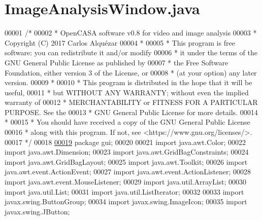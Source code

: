 \hypertarget{_image_analysis_window_8java_source}{}\section{Image\+Analysis\+Window.\+java}
\label{_image_analysis_window_8java_source}

\begin{DoxyCode}
00001 \textcolor{comment}{/*}
00002 \textcolor{comment}{ *   OpenCASA software v0.8 for video and image analysis}
00003 \textcolor{comment}{ *   Copyright (C) 2017  Carlos Alquézar}
00004 \textcolor{comment}{ *}
00005 \textcolor{comment}{ *   This program is free software: you can redistribute it and/or modify}
00006 \textcolor{comment}{ *   it under the terms of the GNU General Public License as published by}
00007 \textcolor{comment}{ *   the Free Software Foundation, either version 3 of the License, or}
00008 \textcolor{comment}{ *   (at your option) any later version.}
00009 \textcolor{comment}{ *}
00010 \textcolor{comment}{ *   This program is distributed in the hope that it will be useful,}
00011 \textcolor{comment}{ *   but WITHOUT ANY WARRANTY; without even the implied warranty of}
00012 \textcolor{comment}{ *   MERCHANTABILITY or FITNESS FOR A PARTICULAR PURPOSE.  See the}
00013 \textcolor{comment}{ *   GNU General Public License for more details.}
00014 \textcolor{comment}{ *}
00015 \textcolor{comment}{ *   You should have received a copy of the GNU General Public License}
00016 \textcolor{comment}{ *   along with this program.  If not, see <https://www.gnu.org/licenses/>.}
00017 \textcolor{comment}{*/}    
00018 
\hypertarget{_image_analysis_window_8java_source_l00019}{}\hyperlink{namespacegui}{00019} \textcolor{keyword}{package }gui;
00020 
00021 \textcolor{keyword}{import} java.awt.Color;
00022 \textcolor{keyword}{import} java.awt.Dimension;
00023 \textcolor{keyword}{import} java.awt.GridBagConstraints;
00024 \textcolor{keyword}{import} java.awt.GridBagLayout;
00025 \textcolor{keyword}{import} java.awt.Toolkit;
00026 \textcolor{keyword}{import} java.awt.event.ActionEvent;
00027 \textcolor{keyword}{import} java.awt.event.ActionListener;
00028 \textcolor{keyword}{import} java.awt.event.MouseListener;
00029 \textcolor{keyword}{import} java.util.ArrayList;
00030 \textcolor{keyword}{import} java.util.List;
00031 \textcolor{keyword}{import} java.util.ListIterator;
00032 
00033 \textcolor{keyword}{import} javax.swing.ButtonGroup;
00034 \textcolor{keyword}{import} javax.swing.ImageIcon;
00035 \textcolor{keyword}{import} javax.swing.JButton;

\end{DoxyCode}
